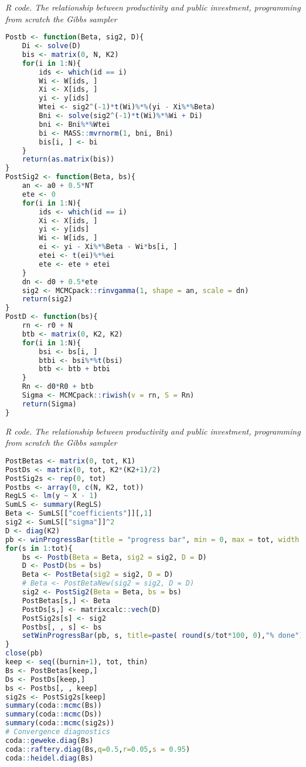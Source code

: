 \begin{enumerate}[leftmargin=*]
\begin{tcolorbox}[enhanced,width=4.67in,center upper,
	fontupper=\large\bfseries,drop shadow southwest,sharp corners]
	\textit{R code. The relationship between productivity and public investment, programming from scratch the Gibbs sampler}
	\begin{VF}
		\begin{lstlisting}[language=R]
Postb <- function(Beta, sig2, D){
	Di <- solve(D)
	bis <- matrix(0, N, K2)
	for(i in 1:N){
		ids <- which(id == i)
		Wi <- W[ids, ]
		Xi <- X[ids, ]
		yi <- y[ids]
		Wtei <- sig2^(-1)*t(Wi)%*%(yi - Xi%*%Beta)
		Bni <- solve(sig2^(-1)*t(Wi)%*%Wi + Di)
		bni <- Bni%*%Wtei
		bi <- MASS::mvrnorm(1, bni, Bni)
		bis[i, ] <- bi
	}
	return(as.matrix(bis))
}
PostSig2 <- function(Beta, bs){
	an <- a0 + 0.5*NT
	ete <- 0
	for(i in 1:N){
		ids <- which(id == i)
		Xi <- X[ids, ]
		yi <- y[ids]
		Wi <- W[ids, ]
		ei <- yi - Xi%*%Beta - Wi*bs[i, ]
		etei <- t(ei)%*%ei
		ete <- ete + etei
	}
	dn <- d0 + 0.5*ete 
	sig2 <- MCMCpack::rinvgamma(1, shape = an, scale = dn)
	return(sig2)
}
PostD <- function(bs){
	rn <- r0 + N
	btb <- matrix(0, K2, K2)
	for(i in 1:N){
		bsi <- bs[i, ]
		btbi <- bsi%*%t(bsi)
		btb <- btb + btbi
	}
	Rn <- d0*R0 + btb
	Sigma <- MCMCpack::riwish(v = rn, S = Rn)
	return(Sigma)
}
\end{lstlisting}
	\end{VF}
\end{tcolorbox}

\begin{tcolorbox}[enhanced,width=4.67in,center upper,
	fontupper=\large\bfseries,drop shadow southwest,sharp corners]
	\textit{R code. The relationship between productivity and public investment, programming from scratch the Gibbs sampler}
	\begin{VF}
		\begin{lstlisting}[language=R]
PostBetas <- matrix(0, tot, K1)
PostDs <- matrix(0, tot, K2*(K2+1)/2)
PostSig2s <- rep(0, tot)
Postbs <- array(0, c(N, K2, tot))
RegLS <- lm(y ~ X - 1)
SumLS <- summary(RegLS)
Beta <- SumLS[["coefficients"]][,1]
sig2 <- SumLS[["sigma"]]^2
D <- diag(K2)
pb <- winProgressBar(title = "progress bar", min = 0, max = tot, width = 300)
for(s in 1:tot){
	bs <- Postb(Beta = Beta, sig2 = sig2, D = D)
	D <- PostD(bs = bs)
	Beta <- PostBeta(sig2 = sig2, D = D)
	# Beta <- PostBetaNew(sig2 = sig2, D = D)
	sig2 <- PostSig2(Beta = Beta, bs = bs)
	PostBetas[s,] <- Beta
	PostDs[s,] <- matrixcalc::vech(D)
	PostSig2s[s] <- sig2
	Postbs[, , s] <- bs
	setWinProgressBar(pb, s, title=paste( round(s/tot*100, 0),"% done"))
}
close(pb)
keep <- seq((burnin+1), tot, thin)
Bs <- PostBetas[keep,]
Ds <- PostDs[keep,]
bs <- Postbs[, , keep]
sig2s <- PostSig2s[keep]
summary(coda::mcmc(Bs))
summary(coda::mcmc(Ds))
summary(coda::mcmc(sig2s))
# Convergence diagnostics
coda::geweke.diag(Bs)
coda::raftery.diag(Bs,q=0.5,r=0.05,s = 0.95)
coda::heidel.diag(Bs)
\end{lstlisting}
	\end{VF}
\end{tcolorbox}



\end{enumerate}
